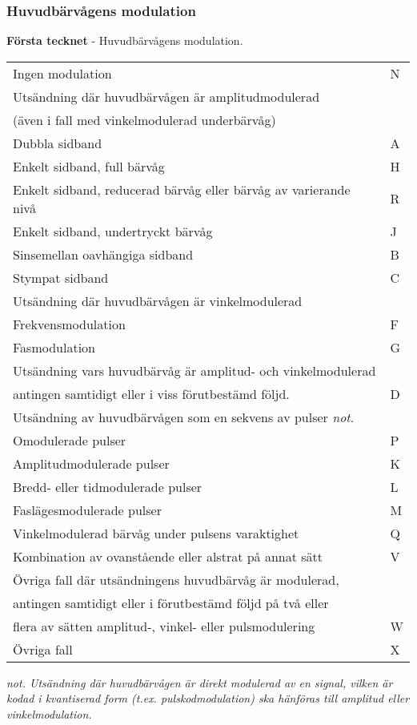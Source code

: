 \subsubsection{Huvudbärvågens modulation}
\textbf{Första tecknet} - Huvudbärvågens modulation.\\
\begin{tabular}{ll}
	Ingen modulation & N\\
	Utsändning där huvudbärvågen är amplitudmodulerad &\\
	(även i fall med vinkelmodulerad underbärvåg) &\\
	Dubbla sidband & A\\
	Enkelt sidband, full bärvåg & H\\
	Enkelt sidband, reducerad bärvåg eller bärvåg av varierande nivå & R\\
	Enkelt sidband, undertryckt bärvåg & J\\
	Sinsemellan oavhängiga sidband & B\\
	Stympat sidband & C\\
	Utsändning där huvudbärvågen är vinkelmodulerad &\\
	Frekvensmodulation & F\\
	Fasmodulation & G\\
	Utsändning vars huvudbärvåg är amplitud- och vinkelmodulerad &\\
	antingen samtidigt eller i viss förutbestämd följd. & D\\
	Utsändning av huvudbärvågen som en sekvens av pulser \emph{not}. &\\
	Omodulerade pulser & P \\
	Amplitudmodulerade pulser & K\\
	Bredd- eller tidmodulerade pulser & L\\
	Faslägesmodulerade pulser & M\\
	Vinkelmodulerad bärvåg under pulsens varaktighet & Q\\
	Kombination av ovanstående eller alstrat på annat sätt & V\\
	Övriga fall där utsändningens huvudbärvåg är modulerad, &\\
	antingen samtidigt eller i förutbestämd följd på två eller &\\
	flera av sätten amplitud-, vinkel- eller pulsmodulering & W\\
	Övriga fall & X\\
\end{tabular}

\emph{not. Utsändning där huvudbärvågen är direkt modulerad av en signal,
	vilken är kodad i kvantiserad form (t.ex. pulskodmodulation) ska hänföras till
	amplitud eller vinkelmodulation.}

